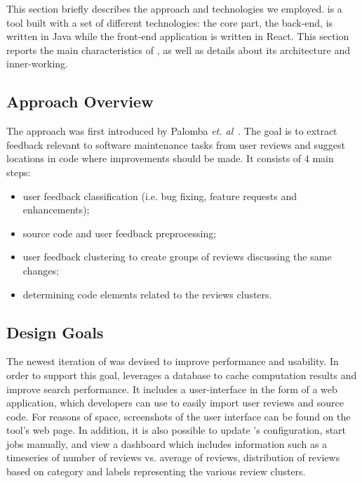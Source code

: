 This section briefly describes the approach and technologies we employed. 
\tool{} is a tool built with a set of different technologies: the core part, the back-end, is written in Java while the front-end application is written in React.
This section reports the main characteristics of \tool{}, as well as details about its architecture and inner-working.

\subsection{Approach Overview}
The \tool{} approach was first introduced by Palomba \textit{et. al}~\cite{Palomba2017}. The goal is to extract feedback relevant to software maintenance tasks from user reviews and suggest locations in code where improvements should be made. 
It consists of 4 main steps:
\begin{itemize}
\item user feedback classification (i.e. bug fixing, feature requests and enhancements);
\item source code and user feedback preprocessing;
\item user feedback clustering to create groups of reviews discussing the same changes;
\item determining code elements related to the reviews clusters.
\end{itemize}

%
%
\subsection{Design Goals}
The newest iteration of \tool{} was devised to improve performance and usability. In order to support this goal, \tool{} leverages a database to cache computation results and improve search performance. It includes a user-interface in the form of a web application, which developers can use to easily import user reviews and source code. For reasons of space, screenshots of the user interface can be found on the tool's web page.
In addition, it is also possible to update \tool{}'s configuration, start jobs manually, and view a dashboard which includes information such as a timeseries of number of reviews vs. average of reviews, distribution of reviews based on category and labels representing the various review clusters.

